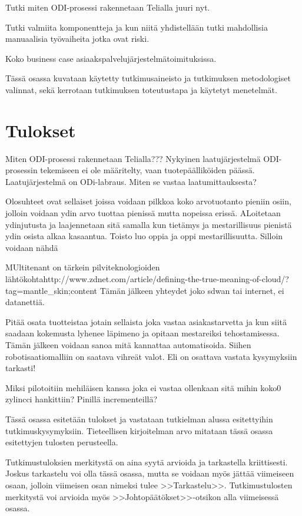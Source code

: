 \documentclass[finnish,12pt,a4paper,pdftex]{article}
\begin{document}
Tutki miten ODI-prosessi rakennetaan Telialla juuri nyt.

Tutki valmiita komponentteja ja kun niitä yhdistellään tutki mahdollisia manuaalisia työvaiheita jotka ovat riski.

Koko business case asiaakspalvelujärjestelmätoimituksissa.

Tässä osassa kuvataan käytetty tutkimusaineisto ja
tutkimuksen metodologiset valinnat, sekä
kerrotaan tutkimuksen toteutustapa ja käytetyt menetelmät. 

\clearpage

\section{Tulokset}
Miten ODI-prosessi rakennetaan Telialla???
Nykyinen laatujärjestelmä ODI-prosessin tekemiseen ei ole määritelty, vaan tuotepäälliköiden päässä.
Laatujärjestelmä on ODi-labraus. Miten se vastaa laatumittauksesta?

Olosuhteet ovat sellaiset joissa voidaan pilkkoa koko arvotuotanto pieniin osiin, jolloin voidaan ydin arvo tuottaa pienissä mutta nopeissa erissä. ALoitetaan ydinjutusta ja laajennetaan sitä samalla kun tietämys ja mestarillisuus pienistä ydin osista alkaa kasaantua. Toisto luo oppia ja oppi mestarillisuutta. Silloin voidaan nähdä 

MUltitenant on tärkein pilviteknologioiden lähtökohtahttp://www.zdnet.com/article/defining-the-true-meaning-of-cloud/?tag=mantle_skin;content
Tämän jälkeen yhteydet joko sdwan tai internet, ei datanettiä.

Pitää osata tuotteistaa jotain sellaista joka vastaa asiakastarvetta ja kun siitä saadaan kokemusta lyhenee läpimeno ja opitaan mestareiksi tehostamisessa. Tämän jälkeen voidaan sanoa mitä kannattaa automatisoida. Siihen robotisaatiomalliin on saatava vihreät valot. Eli on osattava vastata kysymyksiin tarkasti!

Miksi pilotoitiin mehiläisen kanssa joka ei vastaa ollenkaan sitä mihin koko0 zylincci hankittiin? Pinillä incrementeillä?

Tässä osassa esitetään tulokset ja vastataan tutkielman alussa
esitettyihin tutkimuskysymyksiin. Tieteellisen kirjoitelman
arvo mitataan tässä osassa esitettyjen tulosten perusteella. 

Tutkimustuloksien merkitystä on aina syytä arvioida ja tarkastella
kriittisesti.  Joskus tarkastelu voi olla tässä osassa, mutta se
voidaan myös jättää viimeiseen osaan, jolloin viimeisen osan nimeksi
tulee >>Tarkastelu>>. Tutkimustulosten merkitystä voi arvioida myös
>>Johtopäätökset>>-otsikon alla viimeisessä osassa. 
\end{document}
